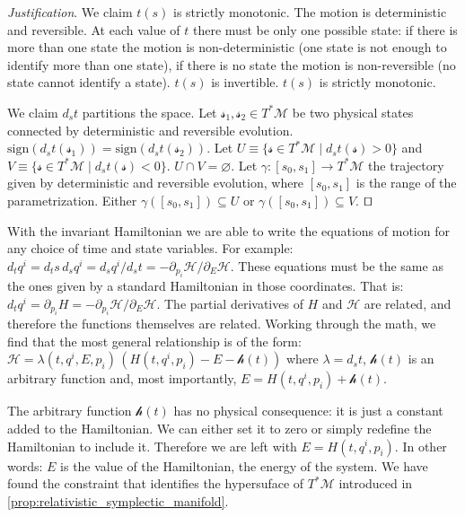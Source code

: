 \documentclass[smallextended]{svjour3}
\numberwithin{equation}{section}
\newenvironment{justification}{\emph{Justification}.}{\hfill\(\qed\)}
\theoremstyle{definition}
\newenvironment{justification}{\emph{Justification}.}{\qed}
\begin{document}
\begin{justification}
	We claim $t(s)$ is strictly monotonic. The motion is deterministic and reversible. At each value of $t$ there must be only one possible state: if there is more than one state the motion is non-deterministic (one state is not enough to identify more than one state), if there is no state the motion is non-reversible (no state cannot identify a state). $t(s)$ is invertible. $t(s)$ is strictly monotonic.
	
	We claim $d_{s}t$ partitions the space. Let $\mathcal{s}_1, \mathcal{s}_2 \in T^*\mathcal{M}$ be two physical states connected by deterministic and reversible evolution. $\mathrm{sign}(d_{s}t(\mathcal{s}_1)) = \mathrm{sign}(d_{s}t(\mathcal{s}_2))$. Let $U \equiv \{\mathcal{s} \in T^*\mathcal{M} \; | \; d_{s}t(\mathcal{s}) > 0 \}$ and $V \equiv \{\mathcal{s} \in T^*\mathcal{M} \; | \; d_{s}t(\mathcal{s}) < 0 \}$. $U \cap V = \varnothing$. Let $\gamma : [s_0, s_1] \rightarrow T^*\mathcal{M}$ the trajectory given by deterministic and reversible evolution, where $[s_0, s_1]$ is the range of the parametrization. Either $\gamma([s_0, s_1]) \subseteq U$ or $\gamma([s_0, s_1]) \subseteq V$.
\end{justification}

With the invariant Hamiltonian we are able to write the equations of motion for any choice of time and state variables. For example: $d_t q^i = d_t s \, d_s q^i = d_s q^i / d_s t = - \partial_{p_i} \mathcal{H} / \partial_{E} \mathcal{H}$. These equations must be the same as the ones given by a standard Hamiltonian in those coordinates. That is: $d_t q^i = \partial_{p_i} H = - \partial_{p_i} \mathcal{H} / \partial_{E} \mathcal{H}$. The partial derivatives of $H$ and $\mathcal{H}$ are related, and therefore the functions themselves are related. Working through the math, we find that the most general relationship is of the form: $\mathcal{H} = \lambda(t,q^i,E,p_i) \, (H(t,q^i,p_i) - E - \mathcal{h}(t))$ where $\lambda = d_s t$, $\mathcal{h}(t)$ is an arbitrary function and, most importantly, $E = H(t,q^i,p_i) + \mathcal{h}(t)$.

The arbitrary function $\mathcal{h}(t)$ has no physical consequence: it is just a constant added to the Hamiltonian. We can either set it to zero or simply redefine the Hamiltonian to include it. Therefore we are left with $E = H(t,q^i,p_i)$. In other words: $E$ is the value of the Hamiltonian, the energy of the system. We have found the constraint that identifies the hypersuface of $T^*\mathcal{M}$ introduced in \ref{prop:relativistic_symplectic_manifold}.
\end{document}
